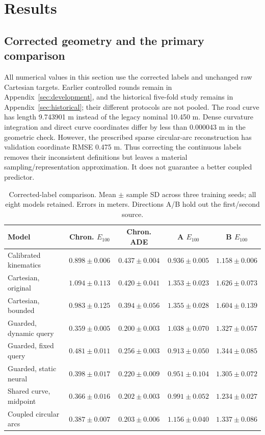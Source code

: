 \documentclass[preprint,12pt]{elsarticle}
\begin{document}
\section{Results}\label{sec:results}
\subsection{Corrected geometry and the primary comparison}\label{sec:corrected_results}
All numerical values in this section use the corrected labels and unchanged raw
Cartesian targets. Earlier controlled rounds remain in
Appendix~\ref{sec:development}, and the historical five-fold study remains in
Appendix~\ref{sec:historical}; their different protocols are not pooled.
The road curve has length 9.743901 m instead of the legacy nominal 10.450 m.
Dense curvature integration and direct curve coordinates differ by less than
0.000043 m in the geometric check. However, the prescribed sparse circular-arc
reconstruction has validation coordinate RMSE 0.475 m. Thus correcting the
continuous labels removes their inconsistent definitions but leaves a material
sampling/representation approximation. It does not guarantee a better coupled
predictor.

\begin{table}[t]
\centering\footnotesize\setlength{\tabcolsep}{3pt}
\caption{Corrected-label comparison. Mean $\pm$ sample SD across three training seeds; all eight models retained. Errors in meters. Directions A/B hold out the first/second source.}
\label{tab:corrected}
\begin{tabular}{lcccc}\toprule
Model & Chron. $E_{100}$ & Chron. ADE & A $E_{100}$ & B $E_{100}$ \\ \midrule
Calibrated kinematics & $0.898 \pm 0.006$ & $0.437 \pm 0.004$ & $0.936 \pm 0.005$ & $1.158 \pm 0.006$ \\
Cartesian, original & $1.094 \pm 0.113$ & $0.420 \pm 0.041$ & $1.353 \pm 0.023$ & $1.626 \pm 0.073$ \\
Cartesian, bounded & $0.983 \pm 0.125$ & $0.394 \pm 0.056$ & $1.355 \pm 0.028$ & $1.604 \pm 0.139$ \\
Guarded, dynamic query & $0.359 \pm 0.005$ & $0.200 \pm 0.003$ & $1.038 \pm 0.070$ & $1.327 \pm 0.057$ \\
Guarded, fixed query & $0.481 \pm 0.011$ & $0.256 \pm 0.003$ & $0.913 \pm 0.050$ & $1.344 \pm 0.085$ \\
Guarded, static neural & $0.398 \pm 0.017$ & $0.220 \pm 0.009$ & $0.951 \pm 0.104$ & $1.305 \pm 0.072$ \\
Shared curve, midpoint & $0.366 \pm 0.016$ & $0.202 \pm 0.003$ & $0.991 \pm 0.052$ & $1.234 \pm 0.027$ \\
Coupled circular arcs & $0.387 \pm 0.007$ & $0.203 \pm 0.006$ & $1.156 \pm 0.040$ & $1.337 \pm 0.086$ \\
\bottomrule\end{tabular}
\end{table}
\end{document}
